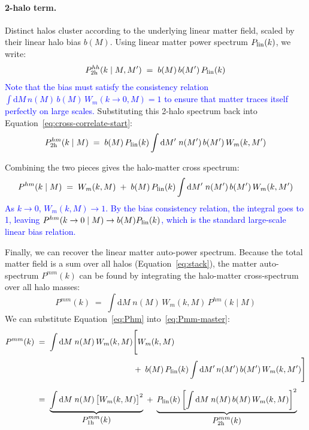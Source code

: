 \documentclass{article}
\newcommand{\dd}{\mathrm{d}}
\begin{document}
\paragraph{2-halo term.} 
Distinct halos cluster according to the underlying linear matter field, scaled by their linear halo bias $b(M)$. Using linear matter power spectrum $P_{\rm lin}(k)$, we write:
\begin{equation}
    P^{hh}_{\rm 2h}(k \mid M, M') \;=\; b(M) \, b(M') \, P_{\rm lin}(k)
\end{equation}
\textcolor{blue}{Note that the bias must satisfy the consistency relation $\int \dd M \, n(M) \, b(M) \, W_m(k\to 0, M) = 1$ to ensure that matter traces itself perfectly on large scales.} 
Substituting this 2-halo spectrum back into Equation~\eqref{eq:cross-correlate-start}:
\begin{equation}
    P^{hm}_{\rm 2h}(k \mid M) \;=\; b(M) \, P_{\rm lin}(k)
    \int \dd M' \; n(M') \, b(M') \, W_m(k, M')
\end{equation}

Combining the two pieces gives the halo-matter cross spectrum:
\begin{equation}
    P^{hm}(k \mid M) \;=\; W_m(k,M) \;+\; b(M) \, P_{\rm lin}(k)
    \int \dd M' \; n(M') \, b(M') \, W_m(k, M')
    \label{eq:Phm}
\end{equation}
\textcolor{blue}{As $k \to 0$, $W_m(k,M) \to 1$. By the bias consistency relation, the integral goes to 1, leaving $P^{hm}(k\to 0 \mid M) \to b(M) P_{\rm lin}(k)$, which is the standard large-scale linear bias relation.}

Finally, we can recover the linear matter auto-power spectrum. Because the total matter field is a sum over all halos (Equation~\eqref{eq:stack}), the matter auto-spectrum $P^{mm}(k)$ can be found by integrating the halo-matter cross-spectrum over all halo masses:
\begin{equation}
    P^{mm}(k) \;=\; \int \dd M \; n(M) \, W_m(k,M) \, P^{hm}(k \mid M)
    \label{eq:Pmm-master}
\end{equation}
We can substitute Equation~\eqref{eq:Phm} into~\eqref{eq:Pmm-master}:
\begin{align} \label{eq:Pmm_decomposition}
    P^{mm}(k) 
    &\;=\; \int \dd M \; n(M) \, W_m(k,M) \Bigg[ W_m(k,M) \nonumber \\
    &\phantom{= \int \dd M \; n(M) \, W_m(k,M) \Bigg[} 
       \;+\; b(M) \, P_{\rm lin}(k) \int \dd M' \, n(M') \, b(M') \, W_m(k,M') \Bigg] \nonumber \\[4pt]
    &\;=\; \underbrace{\int \dd M \; n(M) \, \big[W_m(k,M)\big]^2}_{\displaystyle P^{mm}_{\rm 1h}(k)}
       \;+\; \underbrace{P_{\rm lin}(k) \left[\int \dd M \; n(M) \, b(M) \, W_m(k,M)\right]^2}_{\displaystyle P^{mm}_{\rm 2h}(k)}
\end{align}
\end{document}
